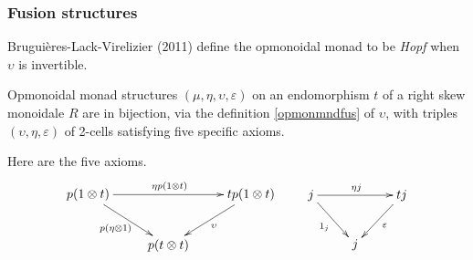 \documentclass{beamer}
\begin{document}
\begin{frame}
  \frametitle{Fusion structures}
  
Brugui\`eres-Lack-Virelizier (2011) define the opmonoidal monad to be {\em Hopf} when $\upsilon$ is invertible.

\begin{theorem}
Opmonoidal monad structures $(\mu,\eta,\upsilon,\varepsilon)$ on an endomorphism 
$t$ of a right skew monoidale $R$ are in bijection,
via the definition \eqref{opmonmndfus} of $\upsilon$, with triples $(\upsilon,\eta, \varepsilon)$ 
of 2-cells satisfying five specific axioms.
\end{theorem}
Here are the five axioms.
\begin{equation*}\label{fusionax4&5}
\begin{aligned}
\xymatrix{
p(1\otimes t) \ar[rd]_{p(\eta \otimes 1)}\ar[rr]^{\eta p(1\otimes t)}   && tp(1\otimes t) \ar[ld]^{\upsilon} \\
& p(t\otimes t)  &
}
\end{aligned}
\qquad
\begin{aligned}
\xymatrix{
j\ar[rd]_{1_j}\ar[rr]^{\eta j}   && tj \ar[ld]^{\varepsilon} \\
& j & 
}
\end{aligned}
\end{equation*}
\end{frame}
\end{document}
